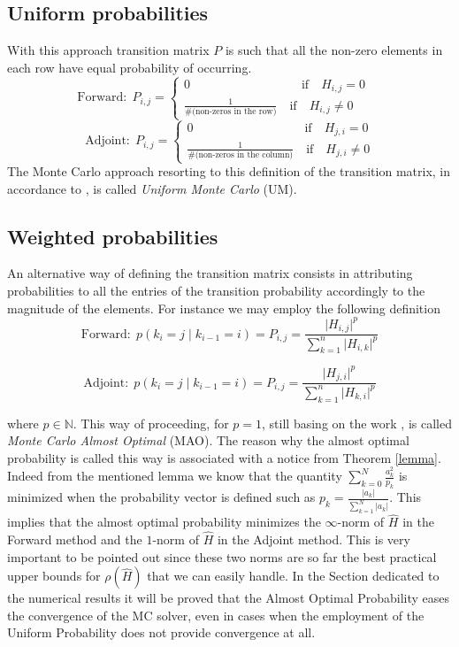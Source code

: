 \documentclass[a4paper,10pt]{article}
\begin{document}
\subsection*{Uniform probabilities}
With this approach transition matrix $P$ is such that all the non-zero elements 
in each row have equal probability of occurring. 
\[
\text{Forward}:\;P_{i,j}=
\begin{cases}
0 \quad \quad \quad \qquad \qquad \qquad \text{if}\quad H_{i,j}=0 \\
\frac{1}{\#(\text{non-zeros in the row)}} \quad \text{if} \quad H_{i,j}\ne 0
\end{cases}\quad 
\]
\[
\text{Adjoint}:\;P_{i,j}=
\begin{cases}
0 \quad \quad \quad \qquad \qquad \qquad \text{if}\quad H_{j,i}=0 \\
\frac{1}{\#(\text{non-zeros in the column)}} \quad \text{if} \quad H_{j,i}\ne 0
\end{cases}
\]
The Monte Carlo approach resorting to this definition of the transition matrix, 
in accordance to \cite{AADBTW2005}, is called \textit{Uniform Monte Carlo} (UM).

\subsection*{Weighted probabilities}
An alternative way of defining the transition matrix consists in attributing 
probabilities to all the entries of the transition probability accordingly 
to the magnitude of the elements. For instance we may employ the following 
definition
\[
\text{Forward}: \;
p(k_i=j \;\lvert\;k_{i-1}=i )=P_{i,j}=\frac{\lvert 
H_{i,j}\rvert^p}{\sum_{k=1}^n 
\lvert H_{i,k}\rvert^p}
\]

\[
\text{Adjoint}: \;
p(k_i=j \;\lvert\;k_{i-1}=i )=P_{i,j}=\frac{\lvert 
H_{j,i}\rvert^p}{\sum_{k=1}^n 
\lvert H_{k,i}\rvert^p}
\]


where $p\in \mathbb{N}$.
This way of proceeding, for $p=1$, still basing on the work \cite{AADBTW2005}, 
is called 
\textit{Monte Carlo Almost Optimal} (MAO).
The reason why the almost optimal probability is called this way is associated 
with a notice from Theorem \ref{lemma}. Indeed from 
the mentioned lemma we know that the quantity $\displaystyle 
\sum_{k=0}^N\frac{a_k^2}{p_k}$ is minimized when the probability vector is 
defined such as $\displaystyle p_k=\frac{\lvert a_k\rvert}{\sum_{k=1}^N \lvert 
a_k\rvert}$. This implies that the almost optimal probability minimizes the 
$\infty$-norm of $\hat{H}$ in the Forward method and the $1$-norm of $\hat{H}$ 
in the 
Adjoint method. This is very important to be pointed out since these two norms 
are so far the best practical upper bounds for $\rho(\hat{H})$ that we can 
easily 
handle. In the Section dedicated to the numerical results it will be proved 
that the Almost Optimal Probability eases the convergence of the MC solver, 
even in cases when the employment of the Uniform Probability does not provide 
convergence at all. 
\end{document}

